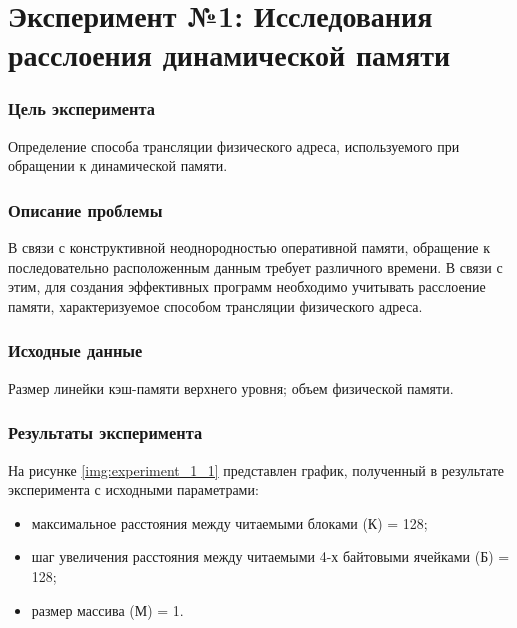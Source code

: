 \chapter*{\textbf{Эксперимент №1: Исследования расслоения динамической памяти}}

\subsection*{\textbf{Цель эксперимента}}
Определение способа трансляции физического адреса, используемого при обращении к динамической памяти. 

\subsection*{\textbf{Описание проблемы}}
В связи с конструктивной неоднородностью оперативной памяти, обращение к последовательно расположенным данным требует различного времени.
В связи с этим, для создания эффективных программ необходимо учитывать расслоение памяти, характеризуемое способом трансляции физического адреса.

\subsection*{\textbf{Исходные данные}}
Размер линейки кэш-памяти верхнего уровня; объем физической памяти.

\subsection*{\textbf{Результаты эксперимента}}
На рисунке \ref{img:experiment_1_1} представлен график, полученный в результате эксперимента с исходными параметрами:
\begin{itemize}
	\item максимальное расстояния между	читаемыми блоками (К) = 128;
	\item шаг увеличения расстояния между читаемыми 4-х байтовыми ячейками (Б) = 128;
	\item размер массива (М) = 1.
\end{itemize}

\begin{figure}[H]
\end{figure}

